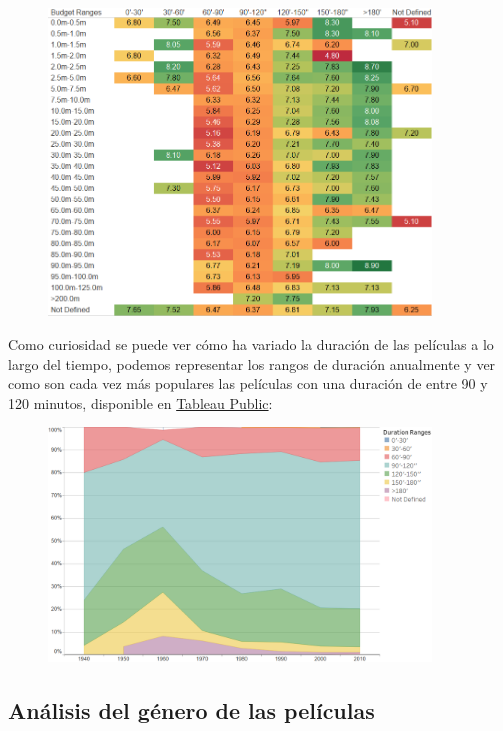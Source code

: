 \documentclass{article}
\begin{document}
\begin{figure}[h]
\centering
\includegraphics[width=4in,clip,keepaspectratio]{./images_latex/budget_duration}
\end{figure}

\clearpage

Como curiosidad se puede ver cómo ha variado la duración de las películas a lo largo del tiempo\cite{justgeek}, podemos representar los rangos de duración anualmente y ver como son cada vez más populares las películas con una duración de entre 90 y 120 minutos, disponible en \href{https://public.tableau.com/profile/javier6580\#!/vizhome/proyecto_fin_de_master_dataset/duration_year}{Tableau Public}:

\begin{figure}[h]
\centering
\includegraphics[width=4in,clip,keepaspectratio]{./images_latex/duration_year}
\end{figure}


\subsection{Análisis del género de las películas}
\end{document}
